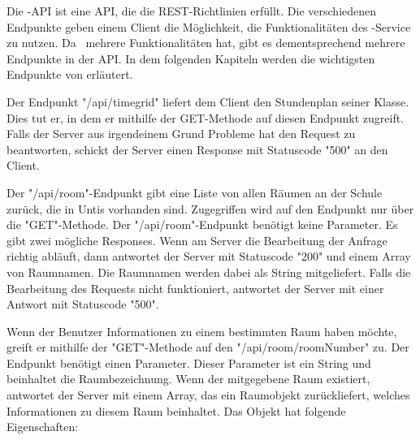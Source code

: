 \label{sec:zeliaapi}

Die \ZELIA-API ist eine API, die die REST-Richtlinien erfüllt. Die verschiedenen Endpunkte geben einem Client die Möglichkeit, die Funktionalitäten des \ZELIA-Service zu nutzen. Da \ZELIA\ mehrere Funktionalitäten hat, gibt es dementsprechend mehrere Endpunkte in der API. In dem folgenden Kapiteln werden die wichtigsten Endpunkte von \ZELIA erläutert.

Der Endpunkt "/api/timegrid" liefert dem Client den Stundenplan seiner Klasse. Dies tut er, in dem er mithilfe der GET-Methode auf diesen Endpunkt zugreift. Falls der Server aus irgendeinem Grund Probleme hat den Request zu beantworten, schickt der Server einen Response mit Statuscode "500" an den Client.


Der "/api/room"-Endpunkt gibt eine Liste von allen Räumen an der Schule zurück, die in Untis vorhanden sind. Zugegriffen wird auf den Endpunkt nur über die "GET"-Methode. Der "/api/room"-Endpunkt benötigt keine Parameter. Es gibt zwei mögliche Responses. Wenn am Server die Bearbeitung der Anfrage richtig abläuft, dann antwortet der Server mit Statuscode "200" und einem Array von Raumnamen. Die Raumnamen werden dabei als String mitgeliefert. 
Falls die Bearbeitung des Requests nicht funktioniert, antwortet der Server mit einer Antwort mit Statuscode "500".


Wenn der Benutzer Informationen zu einem bestimmten Raum haben möchte, greift er mithilfe der "GET"-Methode auf den "/api/room/{roomNumber}" zu. Der Endpunkt benötigt einen Parameter. Dieser Parameter ist ein String und beinhaltet die Raumbezeichnung.  Wenn der mitgegebene Raum existiert, antwortet der Server mit einem Array, das ein Raumobjekt zurückliefert, welches Informationen zu diesem Raum beinhaltet. Das Objekt hat folgende Eigenschaften:


